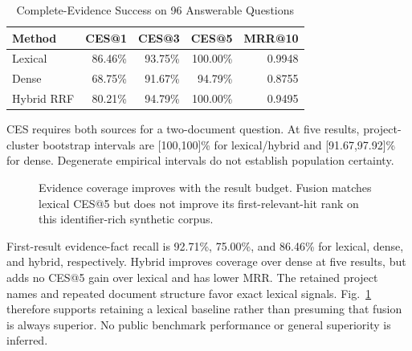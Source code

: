 \documentclass[conference,letterpaper]{IEEEtran}
\begin{document}
\begin{table}[t]
\caption{Complete-Evidence Success on 96 Answerable Questions}
\label{tab:retrieval}
\centering\small
\begin{tabular}{@{}lrrrr@{}}
\toprule
Method & CES@1 & CES@3 & CES@5 & MRR@10 \\
\midrule
Lexical & 86.46\% & 93.75\% & 100.00\% & 0.9948 \\
Dense & 68.75\% & 91.67\% & 94.79\% & 0.8755 \\
Hybrid RRF & 80.21\% & 94.79\% & 100.00\% & 0.9495 \\
\bottomrule
\end{tabular}
\vspace{3pt}
\parbox{\columnwidth}{\footnotesize CES requires both sources for a two-document question. At five results, project-cluster bootstrap intervals are [100,100]\% for lexical/hybrid and [91.67,97.92]\% for dense. Degenerate empirical intervals do not establish population certainty.}
\end{table}

\begin{figure}[t]
\centering
{}
\caption{Evidence coverage improves with the result budget. Fusion matches lexical CES@5 but does not improve its first-relevant-hit rank on this identifier-rich synthetic corpus.}
\label{fig:retrieval}
\end{figure}

First-result evidence-fact recall is 92.71\%, 75.00\%, and 86.46\% for lexical, dense, and hybrid, respectively. Hybrid improves coverage over dense at five results, but adds no CES@5 gain over lexical and has lower MRR. The retained project names and repeated document structure favor exact lexical signals. Fig.~\ref{fig:retrieval} therefore supports retaining a lexical baseline rather than presuming that fusion is always superior. No public benchmark performance or general superiority is inferred.
\end{document}

